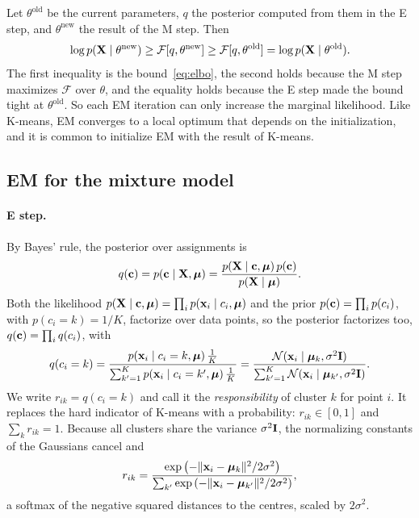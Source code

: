 Let $\theta^{\text{old}}$ be the current parameters, $q$ the posterior computed from them in the E step, and $\theta^{\text{new}}$ the result of the M step. Then
\begin{equation}
  \log p(\mathbf{X}\mid\theta^{\text{new}}) \geq \mathcal{F}[q,\theta^{\text{new}}] \geq \mathcal{F}[q,\theta^{\text{old}}] = \log p(\mathbf{X}\mid\theta^{\text{old}}).
\end{equation}
The first inequality is the bound~\eqref{eq:elbo}, the second holds because the M step maximizes $\mathcal{F}$ over $\theta$, and the equality holds because the E step made the bound tight at $\theta^{\text{old}}$. So each EM iteration can only increase the marginal likelihood. Like K-means, EM converges to a local optimum that depends on the initialization, and it is common to initialize EM with the result of K-means.

\subsection{EM for the mixture model}

\paragraph{E step.} By Bayes' rule, the posterior over assignments is
\begin{equation}
  q(\mathbf{c}) = p(\mathbf{c}\mid\mathbf{X},\boldsymbol{\mu}) = \frac{p(\mathbf{X}\mid\mathbf{c},\boldsymbol{\mu})\,p(\mathbf{c})}{p(\mathbf{X}\mid\boldsymbol{\mu})} .
\end{equation}
Both the likelihood $p(\mathbf{X}\mid\mathbf{c},\boldsymbol{\mu})=\prod_i p(\mathbf{x}_i\mid c_i,\boldsymbol{\mu})$ and the prior $p(\mathbf{c})=\prod_i p(c_i)$, with $p(c_i=k)=1/K$, factorize over data points, so the posterior factorizes too, $q(\mathbf{c})=\prod_i q(c_i)$, with
\begin{equation}
  q(c_i=k) = \frac{p(\mathbf{x}_i\mid c_i=k,\boldsymbol{\mu})\,\frac{1}{K}}{\sum_{k'=1}^K p(\mathbf{x}_i\mid c_i=k',\boldsymbol{\mu})\,\frac{1}{K}}
  = \frac{\mathcal{N}(\mathbf{x}_i\mid\boldsymbol{\mu}_k,\sigma^2\mathbf{I})}{\sum_{k'=1}^K\mathcal{N}(\mathbf{x}_i\mid\boldsymbol{\mu}_{k'},\sigma^2\mathbf{I})} .
\end{equation}
We write $r_{ik}=q(c_i=k)$ and call it the \emph{responsibility} of cluster $k$ for point $i$. It replaces the hard indicator of K-means with a probability: $r_{ik}\in[0,1]$ and $\sum_k r_{ik}=1$. Because all clusters share the variance $\sigma^2\mathbf{I}$, the normalizing constants of the Gaussians cancel and
\begin{equation}
  r_{ik} = \frac{\exp\left(-\|\mathbf{x}_i-\boldsymbol{\mu}_k\|^2/2\sigma^2\right)}{\sum_{k'}\exp\left(-\|\mathbf{x}_i-\boldsymbol{\mu}_{k'}\|^2/2\sigma^2\right)},
  \label{eq:resp}
\end{equation}
a softmax of the negative squared distances to the centres, scaled by $2\sigma^2$.

